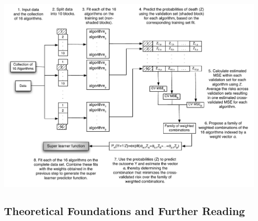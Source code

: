 \documentclass[12pt, krantz2,]{krantz}
\theoremstyle{definition}
\theoremstyle{definition}
\theoremstyle{definition}
\newcommand{\1}{\mathbbm{1}}
\begin{document}
\begin{center}\includegraphics[width=0.8\linewidth]{img/misc/SLKaiserNew} \end{center}

\hypertarget{theoretical-foundations-and-further-reading}{%
\subsection{Theoretical Foundations and Further Reading}\label{theoretical-foundations-and-further-reading}}
\end{document}
